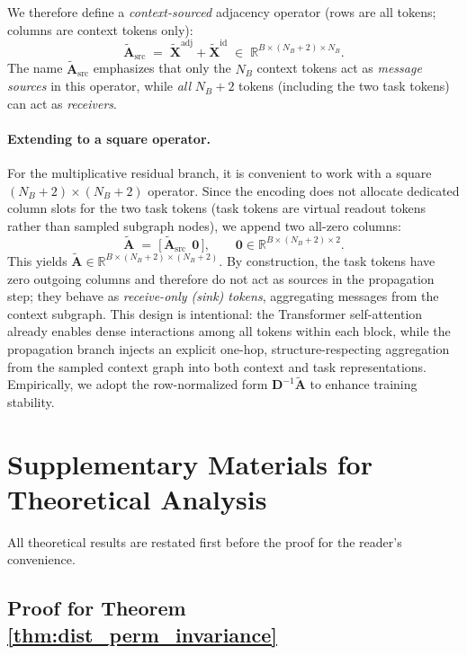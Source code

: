 \documentclass{article}
\theoremstyle{plain}
\theoremstyle{definition}
\theoremstyle{remark}
\begin{document}
We therefore define a \emph{context-sourced} adjacency operator (rows are all tokens; columns are context tokens only):
\begin{equation}
\tilde{\mathbf{A}}_{\text{src}} 
\;=\; 
\tilde{\mathbf{X}}^{\text{adj}} + \tilde{\mathbf{X}}^{\text{id}}
\;\in\;
\mathbb{R}^{B\times (N_B+2)\times N_B}.
\end{equation}
The name $\tilde{\mathbf{A}}_{\text{src}}$ emphasizes that only the $N_B$ context tokens act as \emph{message sources} in this operator, while \emph{all} $N_B+2$ tokens (including the two task tokens) can act as \emph{receivers}.

\paragraph{Extending to a square operator.}
For the multiplicative residual branch, it is convenient to work with a square $(N_B+2)\times (N_B+2)$ operator. Since the encoding does not allocate dedicated column slots for the two task tokens (task tokens are virtual readout tokens rather than sampled subgraph nodes), we append two all-zero columns:
\begin{equation}
\tilde{\mathbf{A}}
\;=\;
\big[\,\tilde{\mathbf{A}}_{\text{src}} \ \ \mathbf{0}\,\big],
\qquad
\mathbf{0}\in\mathbb{R}^{B\times (N_B+2)\times 2}.
\end{equation}
This yields $\tilde{\mathbf{A}}\in\mathbb{R}^{B\times (N_B+2)\times (N_B+2)}$. By construction, the task tokens have zero outgoing columns and therefore do not act as sources in the propagation step; they behave as \emph{receive-only (sink) tokens}, aggregating messages from the context subgraph. This design is intentional: the Transformer self-attention already enables dense interactions among all tokens within each block, while the propagation branch injects an explicit one-hop, structure-respecting aggregation from the sampled context graph into both context and task representations. Empirically, we adopt the row-normalized form $\mathbf{D}^{-1}\tilde{\mathbf{A}}$ to enhance training stability.


\section{Supplementary Materials for Theoretical Analysis} \label{app:proofs}

All theoretical results are restated first before the proof for the reader's convenience.

\subsection{Proof for Theorem \ref{thm:dist_perm_invariance}}\label{app:proof_dist_perm_invariance}
\end{document}
